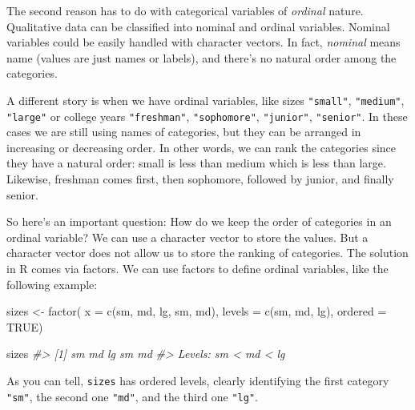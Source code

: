 \documentclass[
]{book}
\newenvironment{Shaded}{\begin{snugshade}}{\end{snugshade}}
\newcommand{\AttributeTok}[1]{\textcolor[rgb]{0.77,0.63,0.00}{#1}}
\newcommand{\CommentTok}[1]{\textcolor[rgb]{0.56,0.35,0.01}{\textit{#1}}}
\newcommand{\ConstantTok}[1]{\textcolor[rgb]{0.00,0.00,0.00}{#1}}
\newcommand{\FunctionTok}[1]{\textcolor[rgb]{0.00,0.00,0.00}{#1}}
\newcommand{\NormalTok}[1]{#1}
\newcommand{\OtherTok}[1]{\textcolor[rgb]{0.56,0.35,0.01}{#1}}
\newcommand{\StringTok}[1]{\textcolor[rgb]{0.31,0.60,0.02}{#1}}
\begin{document}
The second reason has to do with categorical variables of \emph{ordinal} nature.
Qualitative data can be classified into nominal and ordinal variables. Nominal
variables could be easily handled with character vectors. In fact, \emph{nominal}
means name (values are just names or labels), and there's no natural order
among the categories.

A different story is when we have ordinal variables, like sizes \texttt{"small"},
\texttt{"medium"}, \texttt{"large"} or college years \texttt{"freshman"}, \texttt{"sophomore"}, \texttt{"junior"},
\texttt{"senior"}. In these cases we are still using names of categories, but they
can be arranged in increasing or decreasing order. In other words, we can rank
the categories since they have a natural order: small is less than medium which
is less than large. Likewise, freshman comes first, then sophomore, followed by
junior, and finally senior.

So here's an important question: How do we keep the order of categories in an
ordinal variable? We can use a character vector to store the values. But a
character vector does not allow us to store the ranking of categories. The
solution in R comes via factors. We can use factors to define ordinal variables,
like the following example:

\begin{Shaded}
\begin{Highlighting}[]
\NormalTok{sizes }\OtherTok{\textless{}{-}} \FunctionTok{factor}\NormalTok{(}
  \AttributeTok{x =} \FunctionTok{c}\NormalTok{(}\StringTok{\textquotesingle{}sm\textquotesingle{}}\NormalTok{, }\StringTok{\textquotesingle{}md\textquotesingle{}}\NormalTok{, }\StringTok{\textquotesingle{}lg\textquotesingle{}}\NormalTok{, }\StringTok{\textquotesingle{}sm\textquotesingle{}}\NormalTok{, }\StringTok{\textquotesingle{}md\textquotesingle{}}\NormalTok{),}
  \AttributeTok{levels =} \FunctionTok{c}\NormalTok{(}\StringTok{\textquotesingle{}sm\textquotesingle{}}\NormalTok{, }\StringTok{\textquotesingle{}md\textquotesingle{}}\NormalTok{, }\StringTok{\textquotesingle{}lg\textquotesingle{}}\NormalTok{),}
  \AttributeTok{ordered =} \ConstantTok{TRUE}\NormalTok{)}

\NormalTok{sizes}
\CommentTok{\#\textgreater{} [1] sm md lg sm md}
\CommentTok{\#\textgreater{} Levels: sm \textless{} md \textless{} lg}
\end{Highlighting}
\end{Shaded}

As you can tell, \texttt{sizes} has ordered levels, clearly identifying the first
category \texttt{"sm"}, the second one \texttt{"md"}, and the third one \texttt{"lg"}.
\end{document}
